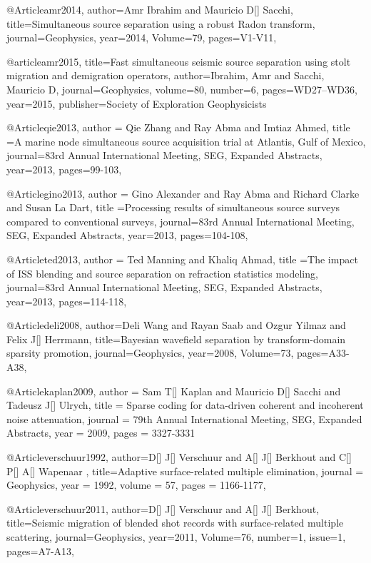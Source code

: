 {%
@Article{amr2014,
  author={Amr Ibrahim and Mauricio D[] Sacchi},
  title={Simultaneous source separation using a robust Radon transform},
  journal={Geophysics},
  year=2014,
  Volume=79,
  pages={V1-V11},
}

@article{amr2015,
  title={Fast simultaneous seismic source separation using stolt migration and demigration operators},
  author={Ibrahim, Amr and Sacchi, Mauricio D},
  journal={Geophysics},
  volume={80},
  number={6},
  pages={WD27--WD36},
  year={2015},
  publisher={Society of Exploration Geophysicists}
}

@Article{qie2013,
  author = {Qie Zhang and Ray Abma and Imtiaz Ahmed},
  title ={A marine node simultaneous source acquisition trial at Atlantis, Gulf of Mexico},
  journal={83rd Annual International Meeting, SEG, Expanded Abstracts},
  year=2013,
  pages={99-103},
}

@Article{gino2013,
  author = {Gino Alexander and Ray Abma and Richard Clarke and Susan La Dart},
  title ={Processing results of simultaneous source surveys compared to conventional surveys},
  journal={83rd Annual International Meeting, SEG, Expanded Abstracts},
  year=2013,
  pages={104-108},
}

@Article{ted2013,
  author = {Ted Manning and Khaliq Ahmad},
  title ={The impact of ISS blending and source separation on refraction statistics modeling},
  journal={83rd Annual International Meeting, SEG, Expanded Abstracts},
  year=2013,
  pages={114-118},
}

@Article{deli2008,
  author={Deli Wang and Rayan Saab and Ozgur Yilmaz and Felix J[] Herrmann},
  title={Bayesian wavefield separation by transform-domain sparsity promotion},
  journal={Geophysics},
  year=2008,
  Volume=73,
  pages={A33-A38},
}


@Article{kaplan2009,
  author = 	 {Sam T[] Kaplan and Mauricio D[] Sacchi and Tadeusz J[] Ulrych},
  title = 	 {Sparse coding for data-driven coherent and incoherent noise attenuation},
  journal = 	 {79th Annual International Meeting, SEG, Expanded Abstracts},
  year = 	 2009,
  pages =	 {3327-3331}
}



@Article{verschuur1992,
  author={D[] J[] Verschuur and A[] J[] Berkhout and C[] P[] A[] Wapenaar },
  title={Adaptive surface-related multiple elimination},
  journal = 	 {Geophysics},
  year = 	 1992,
  volume =	 57,
  pages =	 {1166-1177},
}

@Article{verschuur2011,
  author={D[] J[] Verschuur and A[] J[] Berkhout},
  title={Seismic migration of blended shot records with surface-related multiple scattering},
  journal={Geophysics},
  year=2011,
  Volume=76,
  number=1,
  issue=1,
  pages={A7-A13},
}

}
